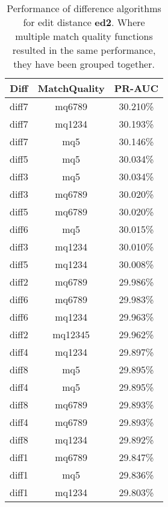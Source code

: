 \begin{table}[tbph]
\begin{center}
\begin{tabular}{|c|c||c|}
\hline
Diff & MatchQuality & PR-AUC  \\
\hline
\hline
diff7 & mq6789 & 30.210\% \\
diff7 & mq1234 & 30.193\% \\
diff7 & mq5 & 30.146\% \\
diff5 & mq5 & 30.034\% \\
diff3 & mq5 & 30.034\% \\
diff3 & mq6789 & 30.020\% \\
diff5 & mq6789 & 30.020\% \\
diff6 & mq5 & 30.015\% \\
diff3 & mq1234 & 30.010\% \\
diff5 & mq1234 & 30.008\% \\
diff2 & mq6789 & 29.986\% \\
diff6 & mq6789 & 29.983\% \\
diff6 & mq1234 & 29.963\% \\
diff2 & mq12345 & 29.962\% \\
diff4 & mq1234 & 29.897\% \\
diff8 & mq5 & 29.895\% \\
diff4 & mq5 & 29.895\% \\
diff8 & mq6789 & 29.893\% \\
diff4 & mq6789 & 29.893\% \\
diff8 & mq1234 & 29.892\% \\
diff1 & mq6789 & 29.847\% \\
diff1 & mq5 & 29.836\% \\
diff1 & mq1234 & 29.803\% \\
\hline
\end{tabular}
\end{center}
\caption{Performance of difference algorithms for
  edit distance \textbf{ed2}.  Where multiple match
  quality functions resulted in the same performance, they
  have been grouped together.}
\label{tab:editlongbyed2}
\end{table}
